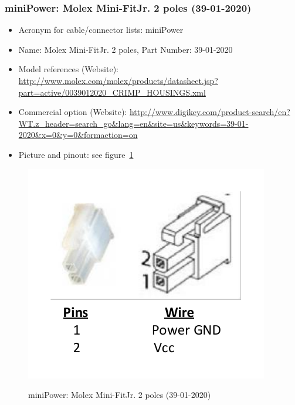 \subsubsection{miniPower: Molex Mini-Fit\textregistered Jr. 2 poles (39-01-2020)} \label{DEVICE:miniMotor}
\begin{itemize}
  \item Acronym for cable/connector lists: miniPower
  \item Name: Molex Mini-Fit\textregistered Jr. 2 poles, Part Number: 39-01-2020
  \item Model references (Website): \href{http://www.molex.com/molex/products/datasheet.jsp?part=active/0039012020\_CRIMP\_HOUSINGS.xml}{http://www.molex.com/molex/products/datasheet.jsp?part=active/0039012020\_CRIMP\_HOUSINGS.xml}
  \item Commercial option (Website): \href{http://www.digikey.com/product-search/en?WT.z\_header=search\_go\&lang=en\&site=us\&keywords=39-01-2020\&x=0\&y=0\&formaction=on}{http://www.digikey.com/product-search/en?WT.z\_header=search\_go\&lang=en\&site=us\&keywords=39-01-2020\&x=0\&y=0\&formaction=on}
  \item Picture and pinout: see figure~\ref{FIG:DEVICEminiPower}
\end{itemize}
\begin{figure}
  \centering
  \includegraphics[angle=90,width=1\columnwidth]{figs/body02/FIGDEVICEminiPower.pdf}\\
  \caption[miniPower: Molex Mini-Fit\textregistered Jr. 2 poles (39-01-2020)]{miniPower: Molex Mini-Fit\textregistered Jr. 2 poles (39-01-2020)}
  \label{FIG:DEVICEminiPower}
\end{figure}
